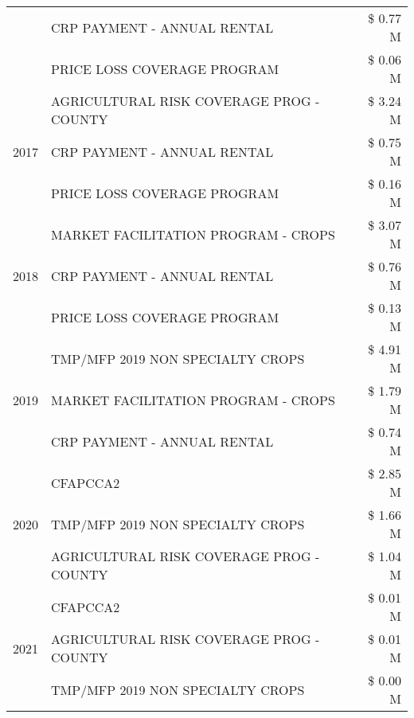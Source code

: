 \begin{tabular}{llr}
 & CRP PAYMENT - ANNUAL RENTAL                   & \$ 0.77 M \\
 & PRICE LOSS COVERAGE PROGRAM                   & \$ 0.06 M \\
\cline{1-3}
\multirow[t]{3}{*}{2017} & AGRICULTURAL RISK COVERAGE PROG - COUNTY & \$ 3.24 M \\
 & CRP PAYMENT - ANNUAL RENTAL & \$ 0.75 M \\
 & PRICE LOSS COVERAGE PROGRAM & \$ 0.16 M \\
\cline{1-3}
\multirow[t]{3}{*}{2018} & MARKET FACILITATION PROGRAM - CROPS & \$ 3.07 M \\
 & CRP PAYMENT - ANNUAL RENTAL & \$ 0.76 M \\
 & PRICE LOSS COVERAGE PROGRAM & \$ 0.13 M \\
\cline{1-3}
\multirow[t]{3}{*}{2019} & TMP/MFP 2019 NON SPECIALTY CROPS & \$ 4.91 M \\
 & MARKET FACILITATION PROGRAM - CROPS & \$ 1.79 M \\
 & CRP PAYMENT - ANNUAL RENTAL & \$ 0.74 M \\
\cline{1-3}
\multirow[t]{3}{*}{2020} & CFAPCCA2 & \$ 2.85 M \\
 & TMP/MFP 2019 NON SPECIALTY CROPS & \$ 1.66 M \\
 & AGRICULTURAL RISK COVERAGE PROG - COUNTY & \$ 1.04 M \\
\cline{1-3}
\multirow[t]{3}{*}{2021} & CFAPCCA2 & \$ 0.01 M \\
 & AGRICULTURAL RISK COVERAGE PROG - COUNTY & \$ 0.01 M \\
 & TMP/MFP 2019 NON SPECIALTY CROPS & \$ 0.00 M \\
\cline{1-3}
\bottomrule
\end{tabular}
